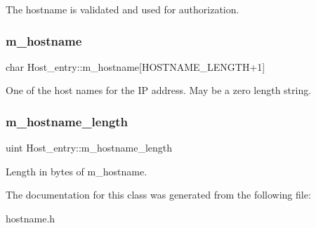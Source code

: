 The hostname is validated and used for authorization. \mbox{\label{classHost__entry_ab82ff9a2730608ba8693968ab942a101}} 
\subsubsection{\texorpdfstring{m\+\_\+hostname}{m\_hostname}}
{\footnotesize\ttfamily char Host\+\_\+entry\+::m\+\_\+hostname\mbox{[}H\+O\+S\+T\+N\+A\+M\+E\+\_\+\+L\+E\+N\+G\+TH+1\mbox{]}}

One of the host names for the IP address. May be a zero length string. \mbox{\label{classHost__entry_a225b190f07932c379e37ca1b39ada799}} 
\subsubsection{\texorpdfstring{m\+\_\+hostname\+\_\+length}{m\_hostname\_length}}
{\footnotesize\ttfamily uint Host\+\_\+entry\+::m\+\_\+hostname\+\_\+length}

Length in bytes of {\ttfamily m\+\_\+hostname}. 

The documentation for this class was generated from the following file\+:\begin{DoxyCompactItemize}
\item 
hostname.\+h\end{DoxyCompactItemize}
